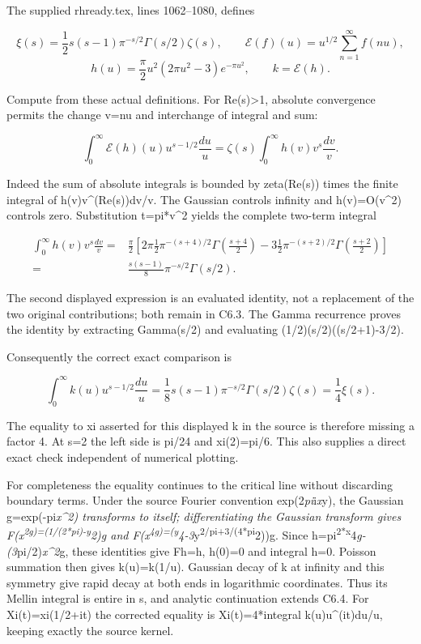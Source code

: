 \documentclass[
]{article}
\begin{document}
The supplied rhready.tex, lines 1062--1080, defines

\[
\xi(s)=\frac12s(s-1)\pi^{-s/2}\Gamma(s/2)\zeta(s),\qquad
\mathcal E(f)(u)=u^{1/2}\sum_{n=1}^{\infty}f(nu),
\] \[
h(u)=\frac\pi2 u^2(2\pi u^2-3)e^{-\pi u^2},\qquad k=\mathcal E(h).
\tag{C6.1}
\]

Compute from these actual definitions. For Re(s)\textgreater1, absolute
convergence permits the change v=nu and interchange of integral and sum:

\[
\int_0^\infty\mathcal E(h)(u)u^{s-1/2}\frac{du}{u}
=\zeta(s)\int_0^\infty h(v)v^s\frac{dv}{v}.
\tag{C6.2}
\]

Indeed the sum of absolute integrals is bounded by zeta(Re(s)) times the
finite integral of \textbar h(v)\textbar v\^{}(Re(s))dv/v. The Gaussian
controls infinity and h(v)=O(v\^{}2) controls zero. Substitution
t=pi*v\^{}2 yields the complete two-term integral

\[
\begin{aligned}
\int_0^\infty h(v)v^s\frac{dv}{v}
={}&\frac\pi2\left[
2\pi\frac12\pi^{-(s+4)/2}\Gamma\left(\frac{s+4}{2}\right)
-3\frac12\pi^{-(s+2)/2}\Gamma\left(\frac{s+2}{2}\right)\right]\\
={}&\frac{s(s-1)}8\pi^{-s/2}\Gamma(s/2).
\end{aligned}
\tag{C6.3}
\]

The second displayed expression is an evaluated identity, not a
replacement of the two original contributions; both remain in C6.3. The
Gamma recurrence proves the identity by extracting Gamma(s/2) and
evaluating (1/2)(s/2)((s/2+1)-3/2).

Consequently the correct exact comparison is

\[
\boxed{\int_0^\infty k(u)u^{s-1/2}\frac{du}{u}
=\frac18s(s-1)\pi^{-s/2}\Gamma(s/2)\zeta(s)=\frac14\xi(s).}
\tag{C6.4}
\]

The equality to xi asserted for this displayed k in the source is
therefore missing a factor 4. At s=2 the left side is pi/24 and
xi(2)=pi/6. This also supplies a direct exact check independent of
numerical plotting.

For completeness the equality continues to the critical line without
discarding boundary terms. Under the source Fourier convention
exp(2\emph{pi}i\emph{x}y), the Gaussian g=exp(-pi\emph{x\^{}2)
transforms to itself; differentiating the Gaussian transform gives
F(x\textsuperscript{2g)=(1/(2*pi)-y}2)g and
F(x\textsuperscript{4g)=(y}4-3}y\textsuperscript{2/pi+3/(4*pi}2))g.
Since h=pi\textsuperscript{2*x}4\emph{g-(3}pi/2)\emph{x\^{}2}g, these
identities give Fh=h, h(0)=0 and integral h=0. Poisson summation then
gives k(u)=k(1/u). Gaussian decay of k at infinity and this symmetry
give rapid decay at both ends in logarithmic coordinates. Thus its
Mellin integral is entire in s, and analytic continuation extends C6.4.
For Xi(t)=xi(1/2+it) the corrected equality is Xi(t)=4*integral
k(u)u\^{}(it)du/u, keeping exactly the source kernel.
\end{document}
